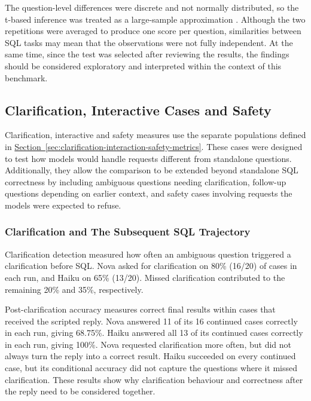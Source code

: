 The question-level differences were discrete and not normally distributed,
so the t-based inference was treated as a large-sample approximation
\citep{lumley2002normality}.
Although the two repetitions were averaged to produce one score per
question, similarities between SQL tasks may mean that the observations
were not fully independent.
At the same time, since the test was selected after reviewing the results, the findings
should be considered exploratory and interpreted within the context
of this benchmark.

\subsection{Clarification, Interactive Cases and Safety}
\label{sec:results-supplementary}

Clarification, interactive and safety measures use the separate populations defined in
\hyperref[sec:clarification-interaction-safety-metrics]{Section~\ref*{sec:clarification-interaction-safety-metrics}}.
These cases were designed to test how models would handle requests
different from standalone questions.
Additionally, they allow the comparison to be extended beyond standalone SQL correctness by including
ambiguous questions needing clarification,
follow-up questions depending on earlier context,
and safety cases involving requests the models were expected to refuse.

\subsubsection{Clarification and The Subsequent SQL Trajectory}

Clarification detection measured how often an ambiguous question triggered a clarification before SQL.
Nova asked for clarification on 80\% (16/20) of cases in each run, and Haiku on 65\% (13/20).
Missed clarification contributed to the remaining 20\% and 35\%, respectively.

Post-clarification accuracy measures correct final results within cases that
received the scripted reply. 
Nova answered 11 of its 16 continued cases correctly in each run, giving 68.75\%.
Haiku answered all 13 of its continued cases correctly in each run, giving 100\%.
Nova requested clarification more often, but did not always turn the reply
into a correct result. Haiku succeeded on every continued case, but its
conditional accuracy did not capture the questions where it missed clarification.
These results show why clarification behaviour and correctness after the reply
need to be considered together.

